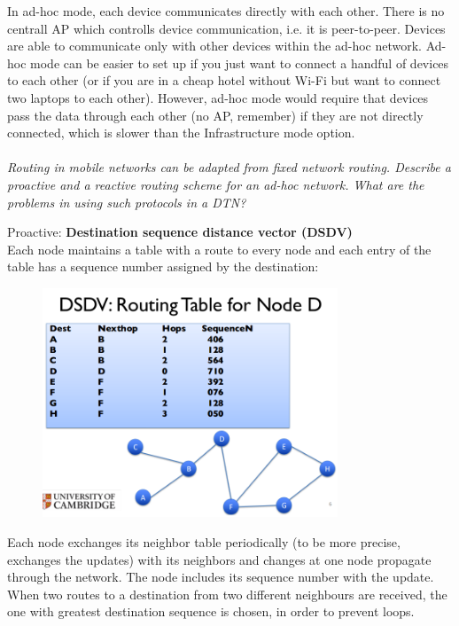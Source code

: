 \documentclass[12pt]{article}
\newcommand*\circled[1]{\tikz[baseline=(char.base)]{
		\node[shape=circle,draw,inner sep=0pt] (char) {#1};}}
\begin{document}
In ad-hoc mode, each device communicates directly with each other. There is no
centrall AP which controlls device communication, i.e. it is peer-to-peer.
Devices are able to communicate only with other devices within the ad-hoc
network. Ad-hoc mode can be easier to set up if you just want to connect
a handful of devices to each other (or if you are in a cheap hotel without
Wi-Fi but want to connect two laptops to each other). However, ad-hoc mode
would require that devices pass the data through each other (no AP, remember)
if they are not directly connected, which is slower than the Infrastructure
mode option.
\\
\\
\textit{\circled{5.} Routing in mobile networks can be adapted from fixed
network routing. Describe a proactive and a reactive routing scheme for an
ad-hoc network. What are the problems in using such protocols in a DTN?}

Proactive: \textbf{Destination sequence distance vector (DSDV)}\\
Each node maintains a table with a route to every node and each entry of the
table has a sequence number assigned by the destination:
\begin{figure}[H]
    \centering
    \includegraphics[width=250pt]{dsdv_table.png}
\end{figure}
Each node exchanges its neighbor table periodically (to be more precise,
exchanges the updates) with its neighbors and changes at one node propagate
through the network. The node includes its sequence number with the update.
When two routes to a destination from two different neighbours are received,
the one with greatest destination sequence is chosen, in order to prevent
loops.
\end{document}
